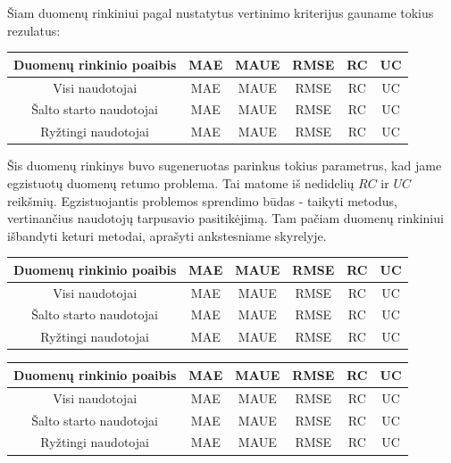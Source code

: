 \documentclass{VUMIFInfMagistrinis}
\begin{document}
\indent
Šiam duomenų rinkiniui pagal nustatytus vertinimo kriterijus gauname tokius rezulatus:
\begin{center}
	\begin{tabular}{||c c c c c c||} 
		Duomenų rinkinio poaibis & MAE & MAUE & RMSE & RC & UC \\
		\hline
		Visi naudotojai & MAE & MAUE & RMSE & RC & UC \\
		\hline
		Šalto starto naudotojai & MAE & MAUE & RMSE & RC & UC \\
		\hline
		Ryžtingi naudotojai & MAE & MAUE & RMSE & RC & UC \\
		
	\end{tabular}
\end{center}
\indent
Šis duomenų rinkinys buvo sugeneruotas parinkus tokius parametrus, kad jame egzistuotų duomenų retumo problema. Tai matome iš nedidelių $RC$ ir $UC$ reikšmių. Egzistuojantis problemos sprendimo būdas - taikyti metodus, vertinančius naudotojų tarpusavio pasitikėjimą. Tam pačiam duomenų rinkiniui išbandyti keturi metodai, aprašyti ankstesniame skyrelyje. 
\begin{center}
	\begin{tabular}{||c c c c c c||} 
		Duomenų rinkinio poaibis & MAE & MAUE & RMSE & RC & UC \\
		\hline
		Visi naudotojai & MAE & MAUE & RMSE & RC & UC \\
		\hline
		Šalto starto naudotojai & MAE & MAUE & RMSE & RC & UC \\
		\hline
		Ryžtingi naudotojai & MAE & MAUE & RMSE & RC & UC \\
	\end{tabular}
\end{center}
\begin{center}
	\begin{tabular}{||c c c c c c||} 
		Duomenų rinkinio poaibis & MAE & MAUE & RMSE & RC & UC \\
		\hline
		Visi naudotojai & MAE & MAUE & RMSE & RC & UC \\
		\hline
		Šalto starto naudotojai & MAE & MAUE & RMSE & RC & UC \\
		\hline
		Ryžtingi naudotojai & MAE & MAUE & RMSE & RC & UC \\
	\end{tabular}
\end{center}
\end{document}
